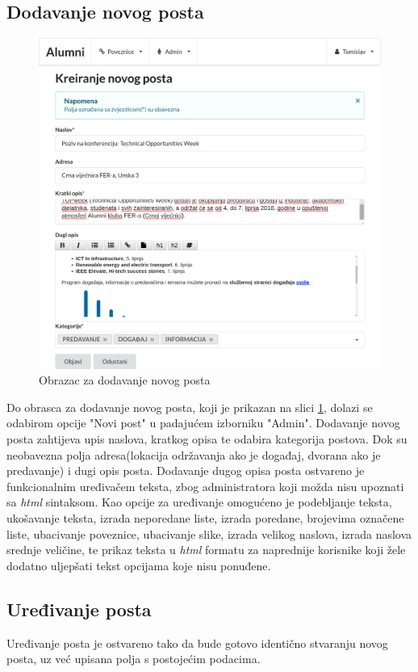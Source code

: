 \documentclass[zavrsni, numeric]{fer}
\begin{document}
\subsection{Dodavanje novog posta}

\begin{figure}[H]
	\centering
	\includegraphics[width=13cm]{slike/novi-post.png}
	\caption{Obrazac za dodavanje novog posta}
	\label{fig:novi-post}
\end{figure}

Do obrasca za dodavanje novog posta, koji je prikazan na slici \ref{fig:novi-post}, dolazi se odabirom opcije "Novi post" u padajućem izborniku "Admin". Dodavanje novog posta zahtijeva upis naslova, kratkog opisa te odabira kategorija postova. Dok su neobavezna polja adresa(lokacija održavanja ako je događaj, dvorana ako je predavanje) i dugi opis posta. Dodavanje dugog opisa posta ostvareno je funkcionalnim uređivačem teksta, zbog administratora koji možda nisu upoznati sa \textit{html} sintaksom. Kao opcije za uređivanje omogućeno je podebljanje teksta, ukošavanje teksta, izrada neporedane liste, izrada poredane, brojevima označene liste, ubacivanje poveznice, ubacivanje slike, izrada velikog naslova, izrada naslova srednje veličine, te prikaz teksta u \textit{html} formatu za naprednije korisnike koji žele dodatno uljepšati tekst opcijama koje nisu ponuđene.

\subsection{Uređivanje posta}
Uređivanje posta je ostvareno tako da bude gotovo identično stvaranju novog posta, uz već upisana polja s postojećim podacima.
\end{document}
